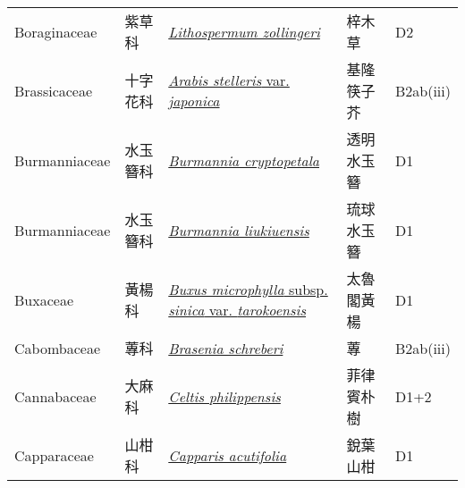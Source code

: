 {\begin{longtable}{L{2.5cm}L{2cm}L{5cm}L{2.5cm}L{3cm}}
    Boraginaceae & 紫草科 & \href{http://www.theplantlist.org/tpl1.1/search?q=Lithospermum+zollingeri}{\textit{Lithospermum zollingeri} } & 梓木草 & D2    \\
    Brassicaceae & 十字花科 & \href{http://www.theplantlist.org/tpl1.1/search?q=Arabis+stelleris+var.+japonica}{\textit{Arabis stelleris} var. \textit{japonica} } & 基隆筷子芥 & B2ab(iii)    \\
    Burmanniaceae & 水玉簪科 & \href{http://www.theplantlist.org/tpl1.1/search?q=Burmannia+cryptopetala}{\textit{Burmannia cryptopetala} } & 透明水玉簪 & D1    \\
    Burmanniaceae & 水玉簪科 & \href{http://www.theplantlist.org/tpl1.1/search?q=Burmannia+liukiuensis}{\textit{Burmannia liukiuensis} } & 琉球水玉簪 & D1    \\
    Buxaceae & 黃楊科 & \href{http://www.theplantlist.org/tpl1.1/search?q=Buxus+microphylla+subsp.+sinica+var.+tarokoensis}{\textit{Buxus microphylla} subsp. \textit{sinica} var. \textit{tarokoensis} } & 太魯閣黃楊 & D1    \\
    Cabombaceae & 蓴科 & \href{http://www.theplantlist.org/tpl1.1/search?q=Brasenia+schreberi}{\textit{Brasenia schreberi} } & 蓴 & B2ab(iii)    \\
    Cannabaceae & 大麻科 & \href{http://www.theplantlist.org/tpl1.1/search?q=Celtis+philippensis}{\textit{Celtis philippensis} } & 菲律賓朴樹 & D1+2    \\
    Capparaceae & 山柑科 & \href{http://www.theplantlist.org/tpl1.1/search?q=Capparis+acutifolia}{\textit{Capparis acutifolia} } & 銳葉山柑 & D1    \\

\end{longtable}}
